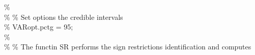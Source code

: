 \hspace{1mm}\hspace{5mm} \hspace{5mm} \hspace{5mm} \hspace{5mm} \hspace{5mm} \hspace{5mm} \hspace{5mm} \hspace{5mm} \textcolor{matlabgreen}{\%  }\\ 
\hspace{1mm}\hspace{5mm} \hspace{5mm} \hspace{5mm} \hspace{5mm} \hspace{5mm} \hspace{5mm} \hspace{5mm} \hspace{5mm} \textcolor{matlabgreen}{\% }\textcolor{matlabgreen}{\% Set options the credible intervals }\\ 
\hspace{1mm}\hspace{5mm} \hspace{5mm} \hspace{5mm} \hspace{5mm} \hspace{5mm} \hspace{5mm} \hspace{5mm} \hspace{5mm} \textcolor{matlabgreen}{\% VARopt.pctg = 95; }\\ 
\hspace{1mm}\hspace{5mm} \hspace{5mm} \hspace{5mm} \hspace{5mm} \hspace{5mm} \hspace{5mm} \hspace{5mm} \hspace{5mm} \textcolor{matlabgreen}{\%  }\\ 
\hspace{1mm}\hspace{5mm} \hspace{5mm} \hspace{5mm} \hspace{5mm} \hspace{5mm} \hspace{5mm} \hspace{5mm} \hspace{5mm} \textcolor{matlabgreen}{\% }\textcolor{matlabgreen}{\% The functin SR performs the sign restrictions identification and computes }\\ 
